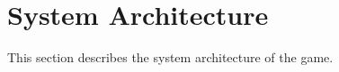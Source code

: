\chapter{System Architecture} \label{ch:system_architecture}
This section describes the system architecture of the game.

